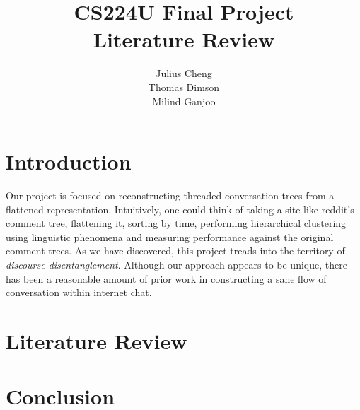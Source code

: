 \documentclass{article}
\title{CS224U Final Project \\Literature Review}
\author{Julius Cheng\\ Thomas Dimson \\ Milind Ganjoo}
\begin{document}
\maketitle

\section{Introduction}
Our project is focused on reconstructing threaded conversation trees
from a flattened representation. Intuitively, one could think of 
taking a site like reddit's comment tree, flattening it, sorting by time, performing
hierarchical clustering using linguistic phenomena and measuring performance against the original comment trees. As we have
discovered, this project treads into the territory of \textit{discourse disentanglement}.
Although our approach appears to be unique, there has been a reasonable
amount of prior work in constructing a sane flow of conversation within internet chat.

\section{Literature Review}

\section{Conclusion}
\end{document}
